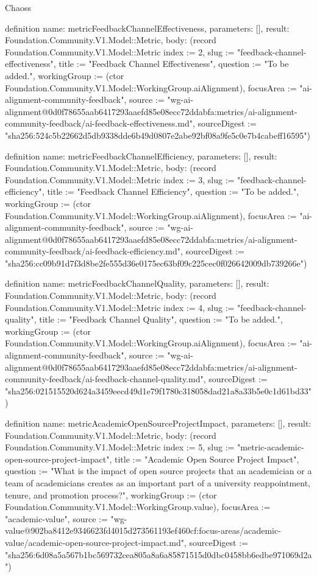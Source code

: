 \begin{lexlean}{Chaoss}
\begin{semanticmodule}
definition{
  name: metricFeedbackChannelEffectiveness,
  parameters: [],
  result: Foundation.Community.V1.Model::Metric,
  body: (record Foundation.Community.V1.Model::Metric {index := 2, slug := "feedback-channel-effectiveness", title := "Feedback Channel Effectiveness", question := "To be added.", workingGroup := (ctor Foundation.Community.V1.Model::WorkingGroup.aiAlignment), focusArea := "ai-alignment-community-feedback", source := "wg-ai-alignment@0d0f78655aab6417293aaefd85e08ecc72ddabfa:metrics/ai-alignment-community-feedback/ai-feedback-effectiveness.md", sourceDigest := "sha256:524c5b22662d5db9338dde6b49d0807e2abe92bf08a9fe5c0e7b4cabeff16595"})
}

definition{
  name: metricFeedbackChannelEfficiency,
  parameters: [],
  result: Foundation.Community.V1.Model::Metric,
  body: (record Foundation.Community.V1.Model::Metric {index := 3, slug := "feedback-channel-efficiency", title := "Feedback Channel Efficiency", question := "To be added.", workingGroup := (ctor Foundation.Community.V1.Model::WorkingGroup.aiAlignment), focusArea := "ai-alignment-community-feedback", source := "wg-ai-alignment@0d0f78655aab6417293aaefd85e08ecc72ddabfa:metrics/ai-alignment-community-feedback/ai-feedback-efficiency.md", sourceDigest := "sha256:cc09b91d7f3d8be2fe555d36e0175ec63bf09c225cec0f026642009db739266e"})
}

definition{
  name: metricFeedbackChannelQuality,
  parameters: [],
  result: Foundation.Community.V1.Model::Metric,
  body: (record Foundation.Community.V1.Model::Metric {index := 4, slug := "feedback-channel-quality", title := "Feedback Channel Quality", question := "To be added.", workingGroup := (ctor Foundation.Community.V1.Model::WorkingGroup.aiAlignment), focusArea := "ai-alignment-community-feedback", source := "wg-ai-alignment@0d0f78655aab6417293aaefd85e08ecc72ddabfa:metrics/ai-alignment-community-feedback/ai-feedback-channel-quality.md", sourceDigest := "sha256:021515520d624a3459eecd49d1e79f1780c318058dad21a8a33b5e0c1d61bd33"})
}

definition{
  name: metricAcademicOpenSourceProjectImpact,
  parameters: [],
  result: Foundation.Community.V1.Model::Metric,
  body: (record Foundation.Community.V1.Model::Metric {index := 5, slug := "metric-academic-open-source-project-impact", title := "Academic Open Source Project Impact", question := "What is the impact of open source projects that an academician or a team of academicians creates as an important part of a university reappointment, tenure, and promotion process?", workingGroup := (ctor Foundation.Community.V1.Model::WorkingGroup.value), focusArea := "academic-value", source := "wg-value@902ba8412e9346623fd4015d273561193ef460cf:focus-areas/academic-value/academic-open-source-project-impact.md", sourceDigest := "sha256:6d08a5a567b1bc569732cea805a8a6a85871515d0dbc0458bb6edbe971069d2a"})
}


\end{semanticmodule}
\end{lexlean}
